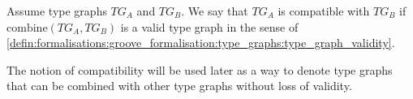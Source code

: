 \begin{defin}
\label{defin:transformation_framework:type_models_and_type_graphs:combining_type_graphs:compatibility}
Assume type graphs $TG_A$ and $TG_B$. We say that $TG_A$ is compatible with $TG_B$ if $\mathrm{combine}(TG_A, TG_B)$ is a valid type graph in the sense of \cref{defin:formalisations:groove_formalisation:type_graphs:type_graph_validity}.
\end{defin}

The notion of compatibility will be used later as a way to denote type graphs that can be combined with other type graphs without loss of validity.